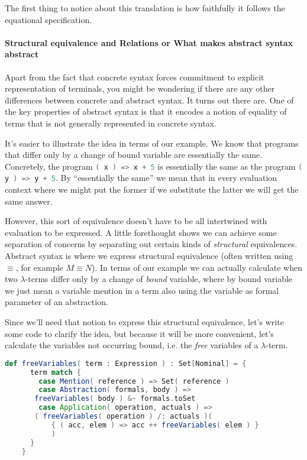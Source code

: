 The first thing to notice about this translation is how faithfully it
follows the equational specification.

\paragraph{Structural equivalence and Relations or What makes abstract syntax abstract}

Apart from the fact that concrete syntax forces commitment to explicit
representation of terminals, you might be wondering if there are any
other differences between concrete and abstract syntax. It turns out
there are. One of the key properties of abstract syntax is that it
encodes a notion of equality of terms that is not generally
represented in concrete syntax.

It's easier to illustrate the idea in terms of our example. We know
that programs that differ only by a change of bound variable are
essentially the same. Concretely, the program
\lstinline[language=Scala]!( x ) => x + 5! is essentially the same as
the program \lstinline[language=Scala]!( y ) => y + 5!. By
``essentially the same'' we mean that in every evaluation context
where we might put the former if we substitute the latter we will get
the same answer. 

However, this sort of equivalence doesn't have to be all intertwined
with evaluation to be expressed. A little forethought shows we can
achieve some separation of concerns by separating out certain kinds of
\emph{structural} equivalences. Abstract syntax is where we express
structural equivalence (often written using $\equiv$, for example $M \equiv N$).
In terms of our example we can actually calculate when two
$\lambda$-terms differ only by a change of \emph{bound} variable,
where by bound variable we just mean a variable mention in a term also
using the variable as formal parameter of an abstraction.

Since we'll need that notion to express this structural equivalence,
let's write some code to clarify the idea, but because it will be more
convenient, let's calculate the variables not occurring bound,
i.e. the \emph{free} variables of a $\lambda$-term.

\begin{lstlisting}[language=Scala]
    def freeVariables( term : Expression ) : Set[Nominal] = {
      term match {
        case Mention( reference ) => Set( reference )
        case Abstraction( formals, body ) =>
	   freeVariables( body ) &~ formals.toSet
        case Application( operation, actuals ) =>
	   ( freeVariables( operation ) /: actuals )(
           { ( acc, elem ) => acc ++ freeVariables( elem ) } 
           )
      }
    }
\end{lstlisting}

